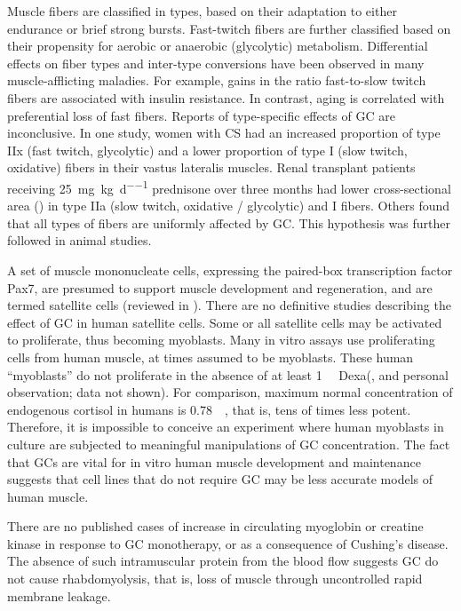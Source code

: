 \documentclass[12pt,english]{report}\usepackage[]{graphicx}\usepackage[]{color}
\begin{document}
Muscle fibers are classified in types, based on their adaptation to
either endurance or brief strong bursts. Fast-twitch fibers are further
classified based on their propensity for aerobic or anaerobic (glycolytic)
metabolism. Differential effects on fiber types and inter-type conversions
have been observed in many muscle-afflicting maladies. For example,
gains in the ratio fast-to-slow twitch fibers are associated with
insulin resistance\citep{simoneau1995skeletal}. In contrast, aging
is correlated with preferential loss of fast fibers\citep{scelsi1980histochemical}.
Reports of type-specific effects of GC are inconclusive. In one study,
women with CS had an increased proportion of type IIx (fast twitch,
glycolytic) and a lower proportion of type I (slow twitch, oxidative)
fibers in their vastus lateralis muscles\citep{rebuffe-scrive1988muscle}.
Renal transplant patients receiving \SI{25}{\milli\gram\per\kilo\gram\per\day}
prednisone over three months had lower cross-sectional area ()
in type IIa (slow twitch, oxidative / glycolytic) and I fibers\citep{topp2003alterations}.
Others found that all types of fibers are uniformly affected by GC\citep{khaleeli1983corticosteroid}.
This hypothesis was further followed in animal studies.

A set of muscle mononucleate cells, expressing the paired-box transcription
factor Pax7, are presumed to support muscle development and regeneration,
and are termed satellite cells (reviewed in \citep{legrand2007skeletal}).
There are no definitive studies describing the effect of GC in human
satellite cells. Some or all satellite cells may be activated to proliferate,
thus becoming myoblasts. Many in vitro assays use proliferating cells
from human muscle, at times assumed to be myoblasts. These human ``myoblasts''
do not proliferate in the absence of at least \SI{1}{\micro\molar}
Dexa(\citep{ham1988improved}, and personal observation; data not
shown). For comparison, maximum normal concentration of endogenous
cortisol in humans is \SI{0.78}{\micro\molar}\citep{griffing2014serum},
that is, tens of times less potent. Therefore, it is impossible to
conceive an experiment where human myoblasts in culture are subjected
to meaningful manipulations of GC concentration. The fact that GCs
are vital for in vitro human muscle development and maintenance suggests
that cell lines that do not require GC may be less accurate models
of human muscle.

There are no published cases of increase in circulating myoglobin
or creatine kinase in response to GC monotherapy, or as a consequence
of Cushing's disease. The absence of such intramuscular protein from
the blood flow suggests GC do not cause rhabdomyolysis, that is, loss
of muscle through uncontrolled rapid membrane leakage.
\end{document}
